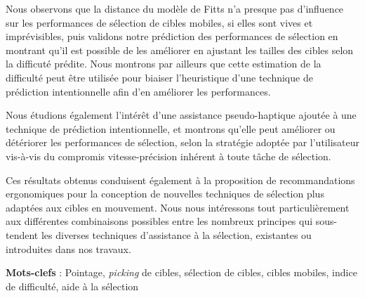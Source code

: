 	Nous observons que la distance du modèle de Fitts n'a presque pas d'influence sur les performances de sélection de cibles mobiles, si elles sont vives et imprévisibles, puis validons notre prédiction des performances de sélection en montrant qu'il est possible de les améliorer en ajustant les tailles des cibles selon la difficuté prédite. Nous montrons par ailleurs que cette estimation de la difficulté peut être utilisée pour biaiser l'heuristique d'une technique de prédiction intentionnelle afin d'en améliorer les performances.
	
	Nous étudions également l'intérêt d'une assistance pseudo-haptique ajoutée à une technique de prédiction intentionnelle, et montrons qu'elle peut améliorer ou détériorer les performances de sélection, selon la stratégie adoptée par l'utilisateur vis-à-vis du compromis vitesse-précision inhérent à toute tâche de sélection.
	
	Ces résultats obtenus conduisent également à la proposition de recommandations ergonomiques pour la conception de nouvelles techniques de sélection plus adaptées aux cibles en mouvement. Nous nous intéressons tout particulièrement aux différentes combinaisons possibles entre les nombreux principes qui sous-tendent les diverses techniques d'assistance à la sélection, existantes ou introduites dans nos travaux.
 
\textbf{Mots-clefs} : Pointage, \emph{picking} de cibles, sélection de cibles, cibles mobiles, indice de difficulté, aide à la sélection